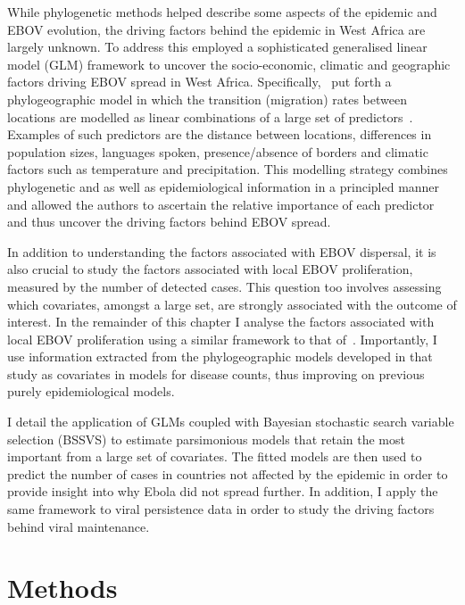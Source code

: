 While phylogenetic methods helped describe some aspects of the epidemic and EBOV evolution, the driving factors behind the epidemic in West Africa are largely unknown.
To address this \cite{Dudas2017} employed a sophisticated generalised linear model (GLM) framework to uncover the socio-economic, climatic and geographic factors driving EBOV spread in West Africa.
Specifically,~\cite{Dudas2017} put forth a phylogeographic model in which the transition (migration) rates between locations are modelled as linear combinations of a large set of predictors~\citep{Lemey2014}.
Examples of such predictors are the distance between locations, differences in population sizes, languages spoken, presence/absence of borders and climatic factors such as temperature and precipitation.
This modelling strategy combines phylogenetic and as well as epidemiological information in a principled manner and allowed the authors to ascertain the relative importance of each predictor and thus uncover the driving factors behind EBOV spread.

In addition to understanding the factors associated with EBOV dispersal, it is also crucial to study the factors associated with local EBOV proliferation, measured by the number of detected cases.
This question too involves assessing which covariates, amongst a large set, are strongly associated with the outcome of interest.
In the remainder of this chapter I analyse the factors associated with local EBOV proliferation using a similar framework to that of~\cite{Dudas2017}.
Importantly, I use information extracted from the phylogeographic models developed in that study as covariates in models for disease counts, thus improving on previous purely epidemiological models.

I detail the application of GLMs coupled with Bayesian stochastic search variable selection (BSSVS) to estimate parsimonious models that retain the most important from a large set of covariates.
The fitted models are then used to predict the number of cases in countries not affected by the epidemic in order to provide insight into why Ebola did not spread further.
In addition, I apply the same framework to viral persistence data in order to study the driving factors behind viral maintenance.

\section{Methods}

